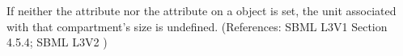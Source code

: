 If neither the attribute  nor the attribute
 on a \Compartment object is set, the unit
associated with that compartment's size is undefined.  (References: SBML L3V1 Section 4.5.4; SBML L3V2 )
